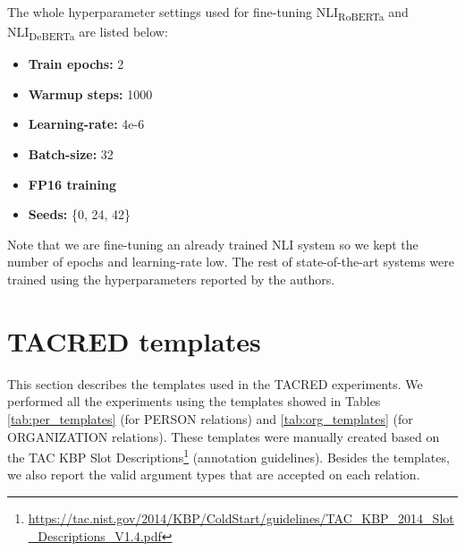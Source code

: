\documentclass[11pt]{article}
\begin{document}
The whole hyperparameter settings used for fine-tuning NLI\textsubscript{RoBERTa} and NLI\textsubscript{DeBERTa} are listed below:

\begin{itemize}
    \item \textbf{Train epochs:} 2
    \item \textbf{Warmup steps:} 1000
    \item \textbf{Learning-rate:} 4e-6
    \item \textbf{Batch-size:} 32
    \item \textbf{FP16 training}
    \item \textbf{Seeds:} \{0, 24, 42\}
    
\end{itemize}

Note that we are fine-tuning an already trained NLI system so we kept the number of epochs and learning-rate low. The rest of state-of-the-art systems were trained using the hyperparameters reported by the authors.

\section{TACRED templates}
\label{sec:templates}

This section describes the templates used in the TACRED experiments. We performed all the experiments using the templates showed in Tables \ref{tab:per_templates} (for PERSON relations) and \ref{tab:org_templates} (for ORGANIZATION relations). These templates were manually created based on the TAC KBP Slot Descriptions\footnote{\url{https://tac.nist.gov/2014/KBP/ColdStart/guidelines/TAC_KBP_2014_Slot_Descriptions_V1.4.pdf}} (annotation guidelines). Besides the templates, we also report the valid argument types that are accepted on each relation.
\end{document}
